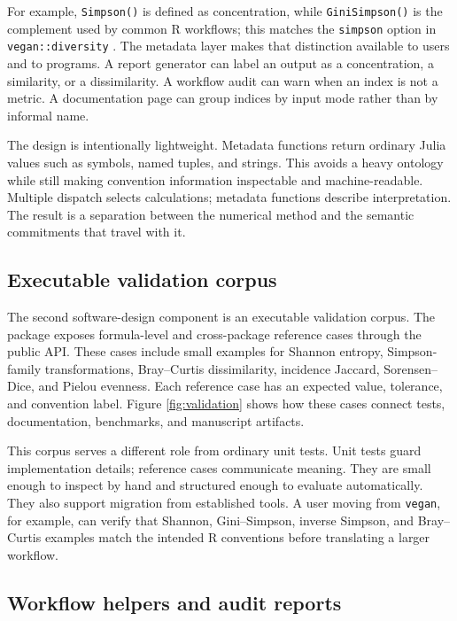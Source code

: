 \documentclass[preprint,12pt,authoryear]{elsarticle}
\begin{document}


For example, \texttt{Simpson()} is defined as concentration, while
\texttt{GiniSimpson()} is the complement used by common R workflows; this
matches the \texttt{simpson} option in \texttt{vegan::diversity}
\citep{oksanen2022vegan}.  The metadata layer makes that distinction
available to users and to programs.
A report generator can label an output as a concentration, a similarity, or a
dissimilarity.  A workflow audit can warn when an index is not a metric.  A
documentation page can group indices by input mode rather than by informal
name.

The design is intentionally lightweight.  Metadata functions return ordinary
Julia values such as symbols, named tuples, and strings.  This avoids a heavy
ontology while still making convention information inspectable and
machine-readable.  Multiple dispatch selects calculations; metadata functions
describe interpretation.  The result is a separation between the numerical
method and the semantic commitments that travel with it.

\subsection{Executable validation corpus}

The second software-design component is an executable validation corpus.
The package exposes formula-level and cross-package reference cases through
the public API.  These cases include small examples for Shannon entropy,
Simpson-family transformations, Bray--Curtis dissimilarity, incidence
Jaccard, Sorensen--Dice, and Pielou evenness.  Each reference case has an
expected value, tolerance, and convention label.  Figure \ref{fig:validation}
shows how these cases connect tests, documentation, benchmarks, and manuscript
artifacts.



This corpus serves a different role from ordinary unit tests.  Unit tests
guard implementation details; reference cases communicate meaning.  They are
small enough to inspect by hand and structured enough to evaluate
automatically.  They also support migration from established tools.  A user
moving from \texttt{vegan}, for example, can verify that Shannon, Gini--Simpson,
inverse Simpson, and Bray--Curtis examples match the intended R conventions
before translating a larger workflow.

\subsection{Workflow helpers and audit reports}
\end{document}
